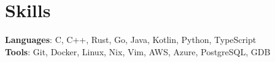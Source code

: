 \documentclass[letterpaper,11pt]{article}
\begin{document}
\section{Skills}
 \begin{itemize}[leftmargin=0.15in, label={}]
    \small{\item{
    
     \textbf{Languages}{: C, C++, Rust, Go, Java, Kotlin, Python, TypeScript} \\
     \textbf{Tools}{: Git, Docker, Linux, Nix, Vim, AWS, Azure, PostgreSQL, GDB}
     
    }}
 \end{itemize}
\end{document}
